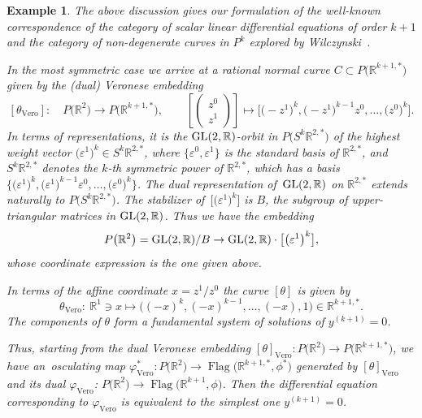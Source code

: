 \documentclass[pdftex]{sigma}%
\newcommand{\R}{\mathbb R}
\newcommand{\Flag}{\operatorname{Flag}}
\newtheorem{ex}[thm]{Example}
\numberwithin{equation}{section}
\begin{document}
\begin{ex}
The above discussion gives our formulation of the well-known correspondence of the category of scalar linear differential equations of order $k+1$ and the category of non-degenerate curves in $P^k$ explored by Wilczynski~\cite{wilch}.

In the most symmetric case we arrive at a rational normal curve $C\subset P\big(\R^{k+1,*}\big)$ given by the (dual) Veronese embedding
\[
[\theta_\text{{Vero}}] \colon\quad P\big(\R^2\big)\to P\big(\R^{k+1,*}\big),\qquad
\left[\begin{pmatrix}z^0\\ z^1\end{pmatrix}\right]\mapsto \big[\big({-}z^1\big)^k, \big({-}z^1\big)^{k-1}z^0, \dots, \big(z^0\big)^k\big].
\]
In terms of representations, it is the ${\rm GL}(2,\R)$-orbit in $P\big(S^k\R^{2,*}\big)$ of the highest weight vector $\big(\varepsilon^1\big)^k\in S^k\R^{2,*}$, where $\big\{\varepsilon^0,\varepsilon^1\big\}$ is the standard basis of $\R^{2,*}$, and $S^k\R^{2,*}$ denotes the $k$-th symmetric power of $\R^{2,*}$, which has a basis $\big\{ \big(\varepsilon^1\big)^k, \big(\varepsilon^1\big)^{k-1}\varepsilon^0, \dots, \big(\varepsilon^0\big)^k \big\}$. The dual representation of~${\rm GL}(2,\R)$ on $\R^{2,*}$ extends naturally to $P\big(S^k\R^{2,*}\big)$. The stabilizer of~$\big[\big(\varepsilon^1\big)^k\big]$ is $B$, the subgroup of upper-triangular matrices in ${\rm GL}(2,\R)$. Thus we have the embedding
\[
P\big(\R^2\big)={\rm GL}(2,\R)/B \to {\rm GL}(2,\R)\cdot \big[\big(\varepsilon^1\big)^k\big],
\]
whose coordinate expression is the one given above.

In terms of the affine coordinate $x=z^1/z^0$ the curve $[\theta]$ is given by
\[
\theta_{\text{Vero}} \colon\ \R^1\ni x\mapsto \big( (-x)^k, (-x)^{k-1},\dots, (-x), 1\big) \in \R^{k+1,*}.
\]
The components of $\theta$ form a fundamental system of solutions of $y^{(k+1)}=0$.

Thus, starting from the dual Veronese embedding $[\theta]_{\text{Vero}}\colon P\big(\R^2\big) \to P\big(\R^{k+1,*}\big)$, we have an~oscu\-lating map $\varphi^*_{\text{Vero}}\colon P\big(\R^2\big)\to \Flag\big(\R^{k+1,*},\phi^*\big)$ generated by $[\theta]_{\text{Vero}}$ and its dual $\varphi_{\text{Vero}}$: $P\big(\R^2\big)\to \Flag\big(\R^{k+1},\phi\big)$. Then the differential equation corresponding to $\varphi_{\text{Vero}}$ is equivalent to the simplest one $y^{(k+1)}=0$.
\end{ex}
\end{document}
